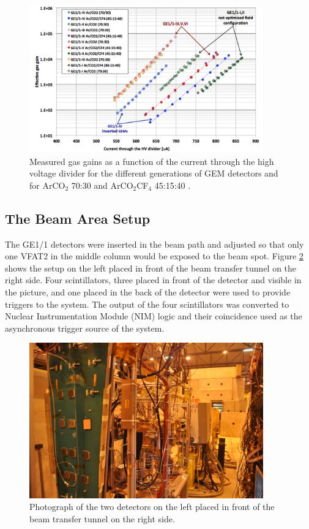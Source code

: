       \begin{figure}[h!]
        \centering
        \includegraphics[width=0.9\textwidth]{img/II-3-test-beam/gain.png}
        \caption{Measured gas gains as a function of the current through the high voltage divider for the different generations of GEM detectors and for ArCO$_2$ 70:30 and ArCO$_2$CF$_4$ 45:15:40 \cite{Merlin:2155685}.}
        \label{fig:II-3-gain}
      \end{figure}

    \subsection{The Beam Area Setup}

      The GE1/1 detectors were inserted in the beam path and adjusted so that only one VFAT2 in the middle column would be exposed to the beam spot. Figure \ref{fig:II-3-test-setup} shows the setup on the left placed in front of the beam transfer tunnel on the right side. Four scintillators, three placed in front of the detector and visible in the picture, and one placed in the back of the detector were used to provide triggers to the system. The output of the four scintillators was converted to Nuclear Instrumentation Module (NIM) logic and their coincidence used as the asynchronous trigger source of the system. \\

      \begin{figure}
        \centering
        \includegraphics[width=0.9\textwidth]{img/II-3-test-beam/test-setup.jpg}
        \caption{Photograph of the two detectors on the left placed in front of the beam transfer tunnel on the right side.}
        \label{fig:II-3-test-setup}
      \end{figure}

